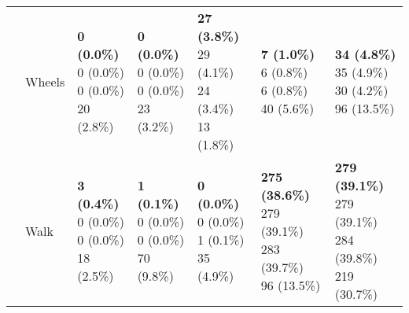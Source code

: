 \begin{table}
\begin{center}
\begin{small}
\begin{tabular}{lllllll}
& Wheels      &  \makecell[l]{\textbf{0 (0.0\%)} \\0 (0.0\%) \\0 (0.0\%) \\20 (2.8\%)}      &  \makecell[l]{\textbf{0 (0.0\%)} \\0 (0.0\%) \\0 (0.0\%) \\23 (3.2\%)}      &  \makecell[l]{\textbf{27 (3.8\%)} \\29 (4.1\%) \\24 (3.4\%) \\13 (1.8\%)}      &  \makecell[l]{\textbf{7 (1.0\%)} \\6 (0.8\%) \\6 (0.8\%) \\40 (5.6\%)}      & \makecell[l]{\textbf{34 (4.8\%)} \\35 (4.9\%) \\30 (4.2\%) \\96 (13.5\%) \\} \\ \cline{2-7}
& Walk      &  \makecell[l]{\textbf{3 (0.4\%)} \\0 (0.0\%) \\0 (0.0\%) \\18 (2.5\%)}      &  \makecell[l]{\textbf{1 (0.1\%)} \\0 (0.0\%) \\0 (0.0\%) \\70 (9.8\%)}      &  \makecell[l]{\textbf{0 (0.0\%)} \\0 (0.0\%) \\1 (0.1\%) \\35 (4.9\%)}      &  \makecell[l]{\textbf{275 (38.6\%)} \\279 (39.1\%) \\283 (39.7\%) \\96 (13.5\%)}      & \makecell[l]{\textbf{279 (39.1\%)} \\279 (39.1\%) \\284 (39.8\%) \\219 (30.7\%) \\} \\ \cline{2-7}

\end{tabular}
\end{small}
\end{center}
\end{table}
